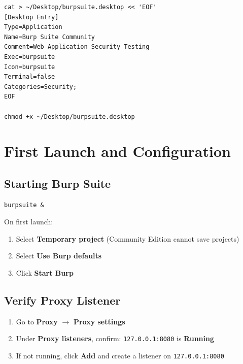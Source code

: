 \begin{lstlisting}[style=terminal, caption={Create desktop shortcut for Burp Suite}]
cat > ~/Desktop/burpsuite.desktop << 'EOF'
[Desktop Entry]
Type=Application
Name=Burp Suite Community
Comment=Web Application Security Testing
Exec=burpsuite
Icon=burpsuite
Terminal=false
Categories=Security;
EOF

chmod +x ~/Desktop/burpsuite.desktop
\end{lstlisting}

\section{First Launch and Configuration}

\subsection{Starting Burp Suite}

\begin{lstlisting}[style=terminal, caption={Launch Burp Suite from terminal}]
burpsuite &
\end{lstlisting}

On first launch:
\begin{enumerate}
  \item Select \textbf{Temporary project} (Community Edition cannot save projects)
  \item Select \textbf{Use Burp defaults}
  \item Click \textbf{Start Burp}
\end{enumerate}


\subsection{Verify Proxy Listener}

\begin{enumerate}
  \item Go to \textbf{Proxy} $\to$ \textbf{Proxy settings}
  \item Under \textbf{Proxy listeners}, confirm: \texttt{127.0.0.1:8080} is \textbf{Running}
  \item If not running, click \textbf{Add} and create a listener on \texttt{127.0.0.1:8080}
\end{enumerate}


